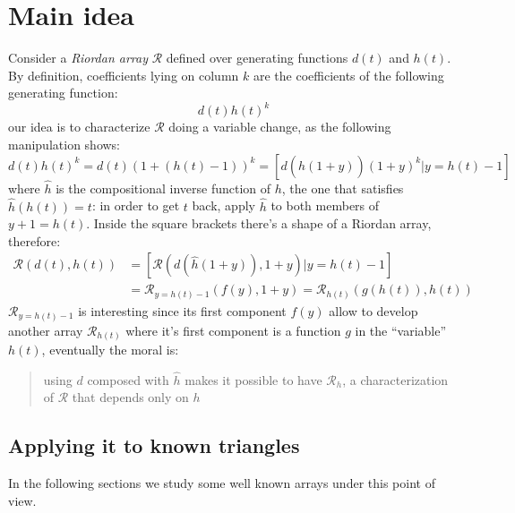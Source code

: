 
\section{Main idea}

Consider a \emph{Riordan array} $\mathcal{R}$ defined over generating
functions $d(t)$ and $h(t)$. By definition, coefficients lying on 
column $k$ are the coefficients of the following generating function:
\begin{displaymath}
    d(t)h(t)^k
\end{displaymath}
our idea is to characterize $\mathcal{R}$ doing a variable change, as the
following manipulation shows:
\begin{displaymath}
    d(t)h(t)^k = d(t)(1 + (h(t)-1))^k = \left[ d(\hat{h}(1+y))(1+y)^k \left| y = h(t)-1 \right. \right]
\end{displaymath}
where $\hat{h}$ is the compositional inverse function of $h$, the one that
satisfies $\hat{h}(h(t)) = t$: in order to get $t$ back, apply $\hat{h}$ to
both members of $y+1 = h(t)$.
Inside the square brackets there's a shape of a Riordan array, therefore:
\begin{displaymath}
    \begin{split}
        \mathcal{R}\left(d(t),h(t)\right) &= \left[ \mathcal{R}\left(d(\hat{h}(1+y)), 1+y\right) \left| y = h(t)-1 \right. \right]\\
        &= \mathcal{R}_{y=h(t)-1}\left( f(y), 1+y \right) =  \mathcal{R}_{h(t)}\left( g(h(t)), h(t) \right) 
    \end{split}
\end{displaymath}
$\mathcal{R}_{y=h(t)-1}$ is interesting since its first component $f(y)$ allow to 
develop another array $\mathcal{R}_{h(t)}$ where it's first component
is a function $g$ in the ``variable'' $h(t)$, eventually the moral is:
\begin{verse}
    using $d$ composed with $\hat{h}$ makes it possible to have $\mathcal{R}_{h}$,
    a characterization of $\mathcal{R}$ that depends only on $h$
\end{verse}

\subsection{Applying it to known triangles}

In the following sections we study some well known arrays under this point of view.

